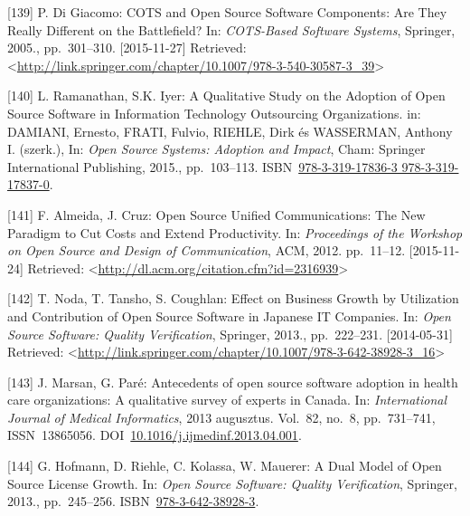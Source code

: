 \documentclass[12pt,magyar,a4paper,oneside]{scrreprt}
\begin{document}
\leavevmode\hypertarget{ref-di_giacomo_cots_2005}{}%
{[}139{]} P. Di Giacomo: COTS and Open Source Software Components: Are
They Really Different on the Battlefield? In: \emph{COTS-Based Software
Systems}, Springer, 2005., pp.~301--310. {[}2015-11-27{]} Retrieved:
\textless{}\url{http://link.springer.com/chapter/10.1007/978-3-540-30587-3_39}\textgreater{}

\leavevmode\hypertarget{ref-damiani_qualitative_2015}{}%
{[}140{]} L. Ramanathan, S.K. Iyer: A Qualitative Study on the Adoption
of Open Source Software in Information Technology Outsourcing
Organizations. in: DAMIANI, Ernesto, FRATI, Fulvio, RIEHLE, Dirk és
WASSERMAN, Anthony I. (szerk.), In: \emph{Open Source Systems: Adoption
and Impact}, Cham: Springer International Publishing, 2015.,
pp.~103--113.
ISBN~\href{https://worldcat.org/isbn/978-3-319-17836-3\%20978-3-319-17837-0}{978-3-319-17836-3 978-3-319-17837-0}.

\leavevmode\hypertarget{ref-almeida_open_2012}{}%
{[}141{]} F. Almeida, J. Cruz: Open Source Unified Communications: The
New Paradigm to Cut Costs and Extend Productivity. In: \emph{Proceedings
of the Workshop on Open Source and Design of Communication}, ACM, 2012.
pp.~11--12. {[}2015-11-24{]} Retrieved:
\textless{}\url{http://dl.acm.org/citation.cfm?id=2316939}\textgreater{}

\leavevmode\hypertarget{ref-noda_effect_2013}{}%
{[}142{]} T. Noda, T. Tansho, S. Coughlan: Effect on Business Growth by
Utilization and Contribution of Open Source Software in Japanese IT
Companies. In: \emph{Open Source Software: Quality Verification},
Springer, 2013., pp.~222--231. {[}2014-05-31{]} Retrieved:
\textless{}\url{http://link.springer.com/chapter/10.1007/978-3-642-38928-3_16}\textgreater{}

\leavevmode\hypertarget{ref-marsan_antecedents_2013}{}%
{[}143{]} J. Marsan, G. Paré: Antecedents of open source software
adoption in health care organizations: A qualitative survey of experts
in Canada. In: \emph{International Journal of Medical Informatics}, 2013
augusztus. Vol.~82, no.~8, pp.~731--741, ISSN~13865056.
DOI~\href{https://doi.org/10.1016/j.ijmedinf.2013.04.001}{10.1016/j.ijmedinf.2013.04.001}.

\leavevmode\hypertarget{ref-hofmann_dual_2013}{}%
{[}144{]} G. Hofmann, D. Riehle, C. Kolassa, W. Mauerer: A Dual Model of
Open Source License Growth. In: \emph{Open Source Software: Quality
Verification}, Springer, 2013., pp.~245--256.
ISBN~\href{https://worldcat.org/isbn/978-3-642-38928-3}{978-3-642-38928-3}.
\end{document}
